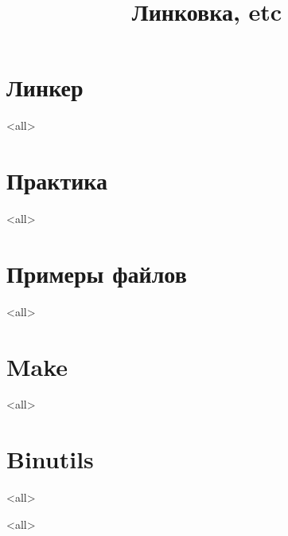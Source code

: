 
\title{Линковка, etc}



\begin{frame}
  \frametitle{}
  \titlepage
\end{frame}

\section{Линкер}

\mode<all>{}

\section[example]{Практика}

\mode<all>{}

\section[example]{Примеры файлов}

\mode<all>{}

\section{Make}

\mode<all>{}

\section{Binutils}

\model<all>{}

\model<all>{}



